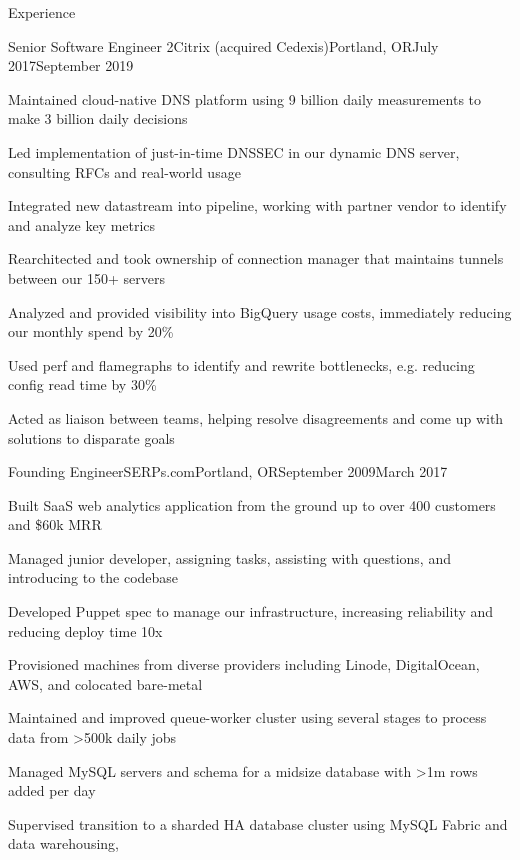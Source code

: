 \documentclass[letterpaper,10pt]{article}
\begin{document}
\begin{res_section}{Experience}
  \begin{res_experienceitem}{Senior Software Engineer 2}{Citrix (acquired Cedexis)}{Portland, OR}{July 2017}{September 2019}
  \item Maintained cloud-native DNS platform using 9 billion daily measurements to make 3 billion daily decisions
  \item Led implementation of just-in-time DNSSEC in our dynamic DNS server, consulting RFCs and real-world usage
  \item Integrated new datastream into pipeline, working with partner vendor to identify and analyze key metrics
  \item Rearchitected and took ownership of connection manager that maintains tunnels between our 150+ servers
  \item Analyzed and provided visibility into BigQuery usage costs, immediately reducing our monthly spend by 20\%
  \item Used perf and flamegraphs to identify and rewrite bottlenecks, e.g. reducing config read time by 30\%
  \item Acted as liaison between teams, helping resolve disagreements and come up with solutions to disparate goals
\end{res_experienceitem}
\begin{res_experienceitem}{Founding Engineer}{SERPs.com}{Portland, OR}{September 2009}{March 2017}
  \item Built SaaS web analytics application from the ground up to over 400 customers and \$60k MRR
  \item Managed junior developer, assigning tasks, assisting with questions, and introducing to the codebase
  \item Developed Puppet spec to manage our infrastructure, increasing reliability and reducing deploy time 10x
  \item Provisioned machines from diverse providers including Linode, DigitalOcean, AWS, and colocated bare-metal
  \item Maintained and improved queue-worker cluster using several stages to process data from \textgreater500k daily jobs
  \item Managed MySQL servers and schema for a midsize database with \textgreater1m rows added per day
  \item Supervised transition to a sharded HA database cluster using MySQL Fabric and data warehousing,\\

\end{res_experienceitem}
\end{res_section}
\end{document}
